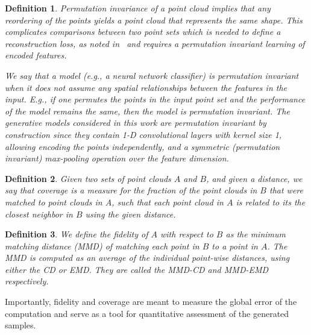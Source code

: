 \documentclass[12pt]{article}
\newtheorem{definition}{Definition}
\begin{document}
    \begin{definition}
        \normalfont
        \textit{Permutation invariance} of a point cloud implies that any reordering of the points yields a point cloud that represents the same shape. This complicates comparisons between two point sets which is needed to define a reconstruction loss, as noted in~\cite{pmlr-v80-achlioptas18a} and requires a permutation invariant learning of encoded features.

        We say that a model (e.g., a neural network classifier) is \emph{permutation invariant} when it does not assume any spatial relationships between the features in the input. E.g., if one permutes the points in the input point set and the performance of the model remains the same, then the model is permutation invariant.
        The generative models considered in this work are permutation invariant by construction since they contain 1-D convolutional layers with kernel size 1, allowing encoding the points \textit{independently}, and a symmetric (permutation invariant) max-pooling operation over the feature dimension.
    \end{definition}

    \begin{definition}
        \normalfont
        Given two sets of point clouds $A$ and $B$, and given a distance, we say that \emph{coverage} is a measure for the fraction of the point clouds in $B$ that were matched to point clouds in $A$, such that each point cloud in $A$ is related to its the closest neighbor in $B$ using the given distance.
    \end{definition}

    \begin{definition}
        \normalfont
        We define the \emph{fidelity} of $A$ with respect to $B$ as the \emph{minimum matching distance} (MMD) of matching each point in $B$ to a point in $A$.
        The \emph{MMD} is computed as an average of the individual point-wise distances, using either the CD or EMD.
        They are called the \emph{MMD-CD} and \emph{MMD-EMD} respectively.
    \end{definition}

    Importantly, fidelity and coverage are meant to measure the global error of the computation and serve as a tool for quantitative assessment of the generated samples.

\end{document}
